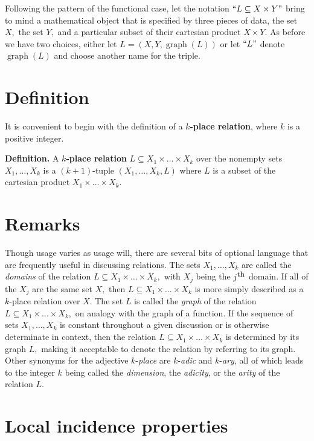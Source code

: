 \documentclass[12pt]{article}
\begin{document}
Following the pattern of the functional case, let the notation $``L \subseteq X \times Y"$ bring to mind a mathematical object that is specified by three pieces of data, the set $X,$ the set $Y,$ and a particular subset of their cartesian product $X \times Y.$  As before we have two choices, either let $L = (X, Y, \operatorname{graph}(L))$ or let $``L"$ denote $\operatorname{graph}(L)$ and choose another name for the triple.

\section{Definition}

It is convenient to begin with the definition of a $k$\textbf{-place relation}, where $k$ is a positive integer.

\textbf{Definition.}  A $k$\textbf{-place relation} $L \subseteq X_1 \times \ldots \times X_k$ over the nonempty sets $X_1, \ldots, X_k$ is a $(k+1)$-tuple $(X_1, \ldots, X_k, L)$ where $L$ is a subset of the cartesian product $X_1 \times \ldots \times X_k.$

\section{Remarks}

Though usage varies as usage will, there are several bits of optional language that are frequently useful in discussing relations.  The sets $X_1, \ldots, X_k$ are called the \textit{domains} of the relation $L \subseteq X_1 \times \ldots \times X_k,$ with $X_j$ being the $j^{\text{\small{th}}}$ domain.  If all of the $X_j$ are the same set $X,$ then $L \subseteq X_1 \times \ldots \times X_k$ is more simply described as a $k$-place relation over $X.$  The set $L$ is called the \textit{graph} of the relation $L \subseteq X_1 \times \ldots \times X_k,$ on analogy with the graph of a function.  If the sequence of sets $X_1, \ldots, X_k$ is constant throughout a given discussion or is otherwise determinate in context, then the relation $L \subseteq X_1 \times \ldots \times X_k$ is determined by its graph $L,$ making it acceptable to denote the relation by referring to its graph.  Other synonyms for the adjective $k$-\textit{place} are $k$-\textit{adic} and $k$-\textit{ary}, all of which leads to the integer $k$ being called the \textit{dimension}, the \textit{adicity}, or the \textit{arity} of the relation $L.$

\section{Local incidence properties}
\end{document}
